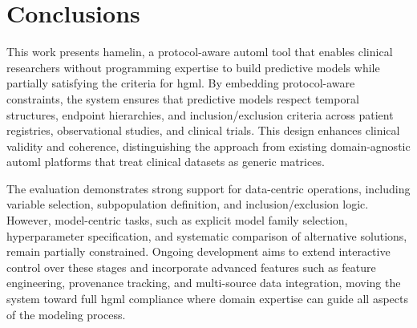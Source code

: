 \documentclass[conference,onecolumn]{IEEEtran}
\begin{document}
\section{Conclusions}  
\label{sec:conclusions}

This work presents \gls{hamelin}, a protocol-aware \gls{automl} tool that enables clinical researchers without programming expertise to build predictive models while partially satisfying the criteria for \gls{hgml}. By embedding protocol-aware constraints, the system ensures that predictive models respect temporal structures, endpoint hierarchies, and inclusion/exclusion criteria across patient registries, observational studies, and clinical trials. This design enhances clinical validity and coherence, distinguishing the approach from existing domain-agnostic \gls{automl} platforms that treat clinical datasets as generic matrices.

The evaluation demonstrates strong support for data-centric operations, including variable selection, subpopulation definition, and inclusion/exclusion logic. However, model-centric tasks, such as explicit model family selection, hyperparameter specification, and systematic comparison of alternative solutions, remain partially constrained. Ongoing development aims to extend interactive control over these stages and incorporate advanced features such as feature engineering, provenance tracking, and multi-source data integration, moving the system toward full \gls{hgml} compliance where domain expertise can guide all aspects of the modeling process.


\begin{footnotesize}




\end{footnotesize}
\end{document}
